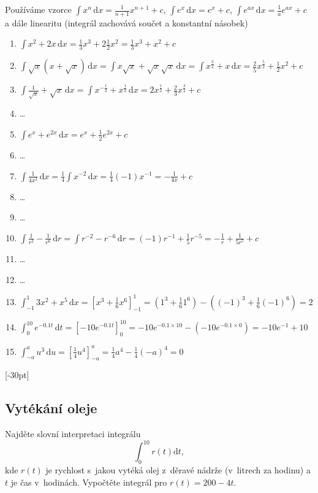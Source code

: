 Používáme vzorce $\int x^n\,\mathrm dx=\frac 1{n+1}x^{n+1}+c$, $\int e^x\,\mathrm dx=e^x+c$, $\int e^{ax}\,\mathrm dx=\frac 1a e^{ax}+c$ a dále linearitu (integrál zachovává součet a konstantní násobek)
\begin{enumerate}[(1)]
  \def\dx{\,\mathrm dx}
\item   $\int x^2+2x\dx=\frac 13 x^3 + 2\frac 12 x^2 = \frac 13 x^3+x^2+c$
\item  $\int \sqrt x(x+\sqrt x)\dx=\int x\sqrt x+\sqrt x\sqrt x\dx=\int x^{\frac 32}+x\dx=\frac 25 x^{\frac 52}+\frac 12 x^2+c$
\item  $\int \frac 1{\sqrt x}+\sqrt x \,\mathrm dx=\int x^{-\frac 12}+x^{\frac 12}\,\mathrm dx=2x^\frac 12+\frac 23 x^{\frac 32}+c$
\item \dots
\item $\int e^x+e^{2x}\,\mathrm dx=e^x+\frac 12 e^{2x}+c$
\item \dots
\item $\int\frac{1}{4x^2}\,\mathrm dx=\frac 14 \int x^{-2}\,\mathrm dx=\frac 14  (-1)x^{-1}=-\frac {1}{4x}+c$
\item \dots
\item \dots
\item $\int \frac 1{r^2}-\frac 1{r^6}\,\mathrm dr=\int r^{-2}-r^{-6}\,\mathrm dr=(-1)r^{-1}+\frac 15 r^{-5}=-\frac 1r+\frac 1{5r^5}+c$
\item \dots
\item \dots
\item $\int_{-1}^1 3x^2+x^5\,\mathrm dx=\left[x^3+\frac 16 x^6\right]_{-1}^1=\left(1^3+\frac 16 1^6\right)-\left((-1)^3+\frac 16 (-1)^6\right)=2$
\item $\int_0^{10} e^{-0.1 t}\,\mathrm dt=\left[-10 e^{-0.1t}\right]_0^{10}=-10 e^{-0.1\times 10}-\left(-10 e^{-0.1\times 0}\right)=-10 e^{-1}+10$
\item  $\int_{-a}^{a} u^3\,\mathrm du=\left[\frac 14 u^4\right]_{-a}^a=\frac 14 a^4 - \frac 14 (-a)^4 = 0$
\end{enumerate}

\konec


\stranka

[-30pt]

\subsection{Vytékání oleje} Najděte slovní interpretaci integrálu
\begin{equation*}
  \int_0^{10} r(t)\mathrm dt,
\end{equation*}
kde $r(t)$ je rychlost s~jakou vytéká olej z~děravé nádrže (v~litrech
za hodinu) a $t$ je čas v~hodinách. Vypočtěte integrál pro $r(t)=200-4t$.

